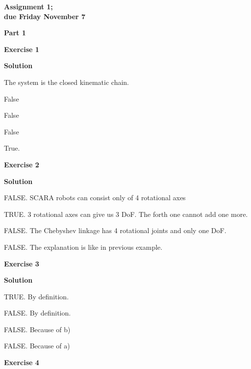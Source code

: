 \documentclass[8pt]{article}
\begin{document}


\begin{center}
\textbf{Assignment 1;\\
due Friday November 7}
\end{center}

\textbf{Part 1}	

\bigskip
	
\textbf{Exercise 1}		
		
\textbf{Solution}

\medskip

The system is the closed kinematic chain.

\begin{list}{()~}{}
\item False
\item False
\item False
\item True.
\end{list}

\textbf{Exercise 2}		
		
\textbf{Solution}

\medskip

\begin{list}{()~}{}
\item FALSE. SCARA robots can consist only of 4 rotational axes
\item TRUE. 3 rotational axes can give us 3 DoF. The forth one cannot add one more.
\item FALSE. The Chebyshev linkage has 4 rotational joints and only one DoF. 
\item FALSE. The explanation is like in previous example.
\end{list}

\textbf{Exercise 3}		
		
\textbf{Solution}

\medskip

\begin{list}{()~}{}
\item
TRUE. By definition.
\item
FALSE. By definition.
\item
FALSE. Because of b)
\item
FALSE. Because of a)
\end{list}

\textbf{Exercise 4}		
		
\end{document}
